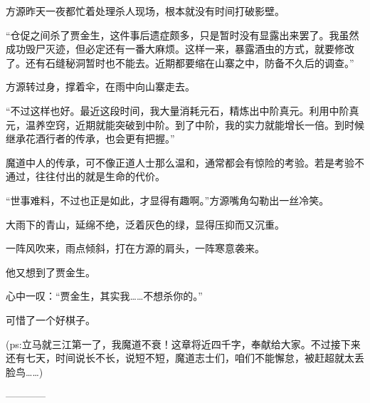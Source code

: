 \begin{this_body}
方源昨天一夜都忙着处理杀人现场，根本就没有时间打破影壁。

“仓促之间杀了贾金生，这件事后遗症颇多，只是暂时没有显露出来罢了。我虽然成功毁尸灭迹，但必定还有一番大麻烦。这样一来，暴露酒虫的方式，就要修改了。还有石缝秘洞暂时也不能去。近期都要缩在山寨之中，防备不久后的调查。”

方源转过身，撑着伞，在雨中向山寨走去。

“不过这样也好。最近这段时间，我大量消耗元石，精炼出中阶真元。利用中阶真元，温养空窍，近期就能突破到中阶。到了中阶，我的实力就能增长一倍。到时候继承花酒行者的传承，也会更有把握。”

魔道中人的传承，可不像正道人士那么温和，通常都会有惊险的考验。若是考验不通过，往往付出的就是生命的代价。

“世事难料，不过也正是如此，才显得有趣啊。”方源嘴角勾勒出一丝冷笑。

大雨下的青山，延绵不绝，泛着灰色的绿，显得压抑而又沉重。

一阵风吹来，雨点倾斜，打在方源的肩头，一阵寒意袭来。

他又想到了贾金生。

心中一叹：“贾金生，其实我……不想杀你的。”

可惜了一个好棋子。

(ps:立马就三江第一了，我魔道不衰！这章将近四千字，奉献给大家。不过接下来还有七天，时间说长不长，说短不短，魔道志士们，咱们不能懈怠，被赶超就太丢脸鸟……)

------------

\end{this_body}

